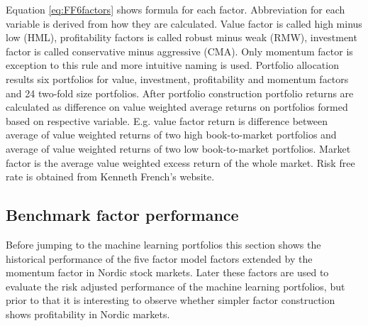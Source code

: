 \documentclass[12pt]{article}
\begin{document}
Equation \ref{eq:FF6factors} shows formula for each factor. Abbreviation for each variable is derived from how they are calculated. Value factor is called high minus low (HML), profitability factors is called robust minus weak (RMW), investment factor is called conservative minus aggressive (CMA). Only momentum factor is exception to this rule and more intuitive naming is used. Portfolio allocation results six portfolios for value, investment, profitability and momentum factors and 24 two-fold size portfolios. After portfolio construction portfolio returns are calculated as difference on value weighted average returns on portfolios formed based on respective variable. E.g. value factor return is difference between average of value weighted returns of two high book-to-market portfolios and average of value weighted returns of two low book-to-market portfolios. Market factor is the average value weighted excess return of the whole market. Risk free rate is obtained from Kenneth French's website. \par

\subsection{Benchmark factor performance}\label{BenchmarkFactorPerformance}

Before jumping to the machine learning portfolios this section shows the historical performance of the \citet{FAMA20151} five factor  model factors extended by the momentum factor in Nordic stock markets. Later these factors are used to evaluate the risk adjusted performance of the machine learning portfolios, but prior to that it is interesting to observe whether simpler factor construction shows profitability in Nordic markets. \par
\end{document}
